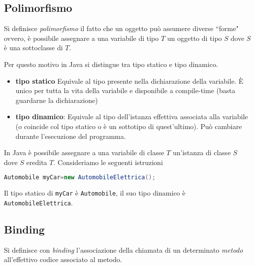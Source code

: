 \documentclass{article}
\begin{document}
\subsection{Polimorfismo}

Si definisce \emph{polimorfismo} il fatto che un oggetto pu\`o assumere diverse ``forme" ovvero, \`e possibile assegnare a una variabile di tipo $T$ un oggetto di tipo $S$ dove $S$ \`e una sottoclasse di $T$.


Per questo motivo in Java si distingue tra tipo statico e tipo dinamico.
\begin{itemize}
	\item \textbf{tipo statico} Equivale al tipo presente nella dichiarazione della variabile.
	È unico per tutta la vita della variabile e disponibile a compile-time (basta guardarne la dichiarazione)
	\item \textbf{tipo dinamico}: Equivale al tipo dell'istanza effettiva associata alla variabile (o coincide col tipo statico o è un sottotipo di quest'ultimo).
	Può cambiare durante l'esecuzione del programma.
\end{itemize}

In Java è possibile assegnare a una variabile di classe $T$ un'istanza di classe $S$
dove $S$ eredita $T$. Consideriamo le seguenti istruzioni

\begin{lstlisting}[language=Java,escapechar=|]
Automobile myCar=new AutomobileElettrica();
\end{lstlisting}
Il tipo statico di \texttt{myCar} \`e \texttt{Automobile}, il suo tipo dinamico \`e \texttt{AutomobileElettrica}.






\subsection{Binding}

Si definisce con \emph{binding} l'associazione della chiamata di un determinato \emph{metodo} all'effettivo codice associato al metodo.\\
\end{document}
